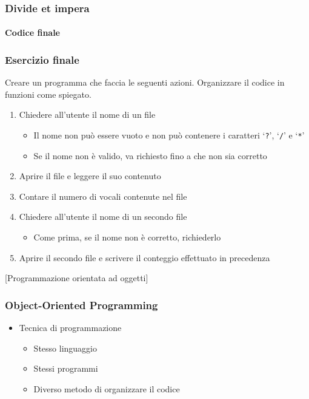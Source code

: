 \begin{exampleframe}
    \frametitle{Divide et impera}
    \framesubtitle{Codice finale}

    \centering
\end{exampleframe}

\begin{exerciseframe}
    \frametitle{Esercizio finale}

    Creare un programma che faccia le seguenti azioni.
    Organizzare il codice in funzioni come spiegato.

    \begin{enumerate}
        \item Chiedere all’utente il nome di un file
        \begin{itemize}
            \item Il nome non può essere vuoto e non può contenere i caratteri `\texttt{?}', `\texttt{/}' e `\texttt{*}'
            \item Se il nome non è valido, va richiesto fino a che non sia corretto
        \end{itemize}
        \item Aprire il file e leggere il suo contenuto
        \item Contare il numero di vocali contenute nel file
        \item Chiedere all’utente il nome di un secondo file
        \begin{itemize}
            \item Come prima, se il nome non è corretto, richiederlo
        \end{itemize}
        \item Aprire il secondo file e scrivere il conteggio effettuato in precedenza
    \end{enumerate}
\end{exerciseframe}

[Programmazione orientata ad oggetti]

\begin{contentframe}
    \frametitle{Object-Oriented Programming}

    \begin{itemize}
        \item Tecnica di programmazione
        \begin{itemize}
            \item Stesso linguaggio
            \item Stessi programmi
            \item Diverso metodo di organizzare il codice
        \end{itemize}
    \end{itemize}
\end{contentframe}

